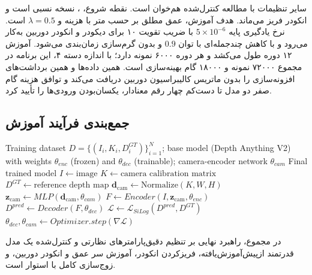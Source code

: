 سایر تنظیمات با مطالعه کنترل‌شده  هم‌خوان است. نقطه شروع، \basemodel{}، نسخه نسبی  است و انکودر  فریز می‌ماند. هدف آموزش، عمق مطلق بر حسب متر با هزینه  و $\lambda=0.5$ است. نرخ یادگیری پایه $5\times10^{-6}$ با ضریب تقویت ۱۰ برای دیکودر و انکودر دوربین به‌کار می‌رود و با کاهش چندجمله‌ای با توان $0.9$ و بدون گرم‌سازی زمان‌بندی می‌شود. آموزش ۱۲ دوره طول می‌کشد و هر دوره ۶۰۰۰ نمونه دارد؛ با اندازه دسته ۴، این برنامه در مجموع ۷۲۰۰۰ نمونه و ۱۸۰۰۰ گام بهینه‌سازی است. \controlmodel{} همین داده‌ها و همین برداشت‌های افزونه‌سازی را بدون ماتریس کالیبراسیون دوربین دریافت می‌کند و توافق هزینه گام صفر دو مدل تا دست‌کم چهار رقم معنادار، یکسان‌بودن ورودی‌ها را تأیید کرد.

\subsection{جمع‌بندی فرآیند آموزش}

\begin{algorithm}[htbp]
\caption{روند آموزش مدل با پارامترهای هندسی}
\label{alg:training_pipeline}
\begin{latin}\raggedright
\begin{algorithmic}[1]
\REQUIRE Training dataset $D = \{(I_i, K_i, D^{GT}_i)\}_{i=1}^N$; base model (Depth Anything V2) with weights $\theta_{enc}$ (frozen) and $\theta_{dec}$ (trainable); camera-encoder network $\theta_{cam}$
\ENSURE Final trained model
  \STATE $I \gets \text{image}$
  \STATE $K \gets \text{camera calibration matrix}$
  \STATE $D^{GT} \gets \text{reference depth map}$
  \STATE {}
  \STATE $\mathbf{d}_{\mathrm{cam}} \gets \text{Normalize}(K, W, H)$
  \STATE $\mathbf{z}_{\mathrm{cam}} \gets MLP(\mathbf{d}_{\mathrm{cam}}, \theta_{cam})$
  \STATE {}
  \STATE $F \gets Encoder(I, \mathbf{z}_{\mathrm{cam}}, \theta_{enc})$
  \STATE {}
  \STATE $D^{pred} \gets Decoder(F, \theta_{dec})$
  \STATE {}
  \STATE $\mathcal{L} \gets \mathcal{L}_{SiLog}(D^{pred}, D^{GT})$
  \STATE {}
  \STATE $\theta_{dec}, \theta_{cam} \gets Optimizer.step(\nabla \mathcal{L})$
 \ENDFOR
\ENDFOR
\end{algorithmic}
\end{latin}
\end{algorithm}

در مجموع، راهبرد نهایی بر تنظیم دقیق‌پارامترهای نظارتی و کنترل‌شده یک مدل قدرتمند ازپیش‌آموزش‌یافته، فریزکردن انکودر، آموزش سر عمق و انکودر دوربین، و زوج‌سازی کامل \proposedmodel{} با \controlmodel{} استوار است.

